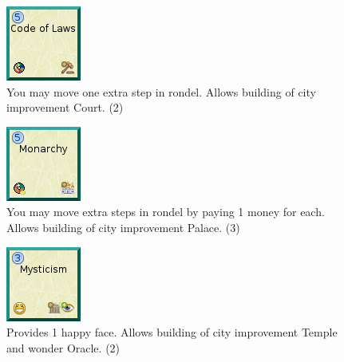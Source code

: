 \documentclass[11pt,a4paper,titlepage]{article}
\begin{document}
{{  \begin{figure}[!htb]
    \begin{minipage}[c]{0.1\textwidth}
      \includegraphics[scale=.7]{doe_tech_code_of_laws.png}
    \end{minipage}\hfill
    \begin{minipage}[c]{0.6\textwidth}
      \captionsetup{labelformat=empty, justification=justified, singlelinecheck=false}
      \caption{You may move one extra step in rondel. Allows building of city improvement Court. (2)}
    \end{minipage}\hfill
    \label{fig:tech_code_of_laws}
  \end{figure}

  \begin{figure}[!htb]
    \begin{minipage}[c]{0.1\textwidth}
      \includegraphics[scale=.7]{doe_tech_monarchy.png}
    \end{minipage}\hfill
    \begin{minipage}[c]{0.6\textwidth}
      \captionsetup{labelformat=empty, justification=justified, singlelinecheck=false}
      \caption{You may move extra steps in rondel by paying 1 money for each. Allows building of city improvement Palace. (3)}
    \end{minipage}\hfill
    \label{fig:tech_monarchy}
  \end{figure}

  \begin{figure}[!htb]
    \begin{minipage}[c]{0.1\textwidth}
      \includegraphics[scale=.7]{doe_tech_mysticism.png}
    \end{minipage}\hfill
    \begin{minipage}[c]{0.6\textwidth}
      \captionsetup{labelformat=empty, justification=justified, singlelinecheck=false}
      \caption{Provides 1 happy face. Allows building of city improvement Temple and wonder Oracle. (2)}
    \end{minipage}\hfill
    \label{fig:tech_mysticism}
  \end{figure}

}}
\end{document}
